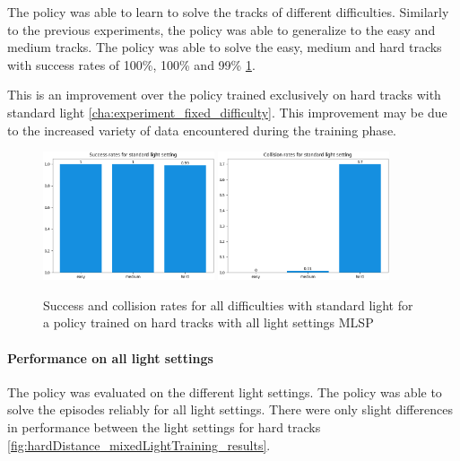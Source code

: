 The policy was able to learn to solve the tracks of different difficulties. Similarly to the previous experiments, the policy was able to generalize to the easy and medium tracks. The policy was able to solve the easy, medium and hard tracks with success rates of 100\%, 100\% and 99\% \ref{fig:hardDistance_mixedLight_generalization}. 

This is an improvement over the policy trained exclusively on hard tracks with standard light \ref{cha:experiment_fixed_difficulty}.
This improvement may be due to the increased variety of data encountered during the training phase.

\begin{figure}
    \centering
    \includegraphics[width=0.45\textwidth]{Bilder/notebook_images/hardDistanceMixedLight_eval_standard_success_rates_barplot.png}
    \includegraphics[width=0.45\textwidth]{Bilder/notebook_images/hardDistanceMixedLight_eval_standard_collision_rates_barplot.png}
    \caption{Success and collision rates for all difficulties with standard light for a policy trained on hard tracks with all light settings \acs{MLSP}}
    \label{fig:hardDistance_mixedLight_generalization}
\end{figure}

\paragraph{Performance on all light settings}

The policy was evaluated on the different light settings. The policy was able to solve the episodes reliably for all light settings. There were only slight differences in performance between the light settings for hard tracks \ref{fig:hardDistance_mixedLightTraining_results}.


